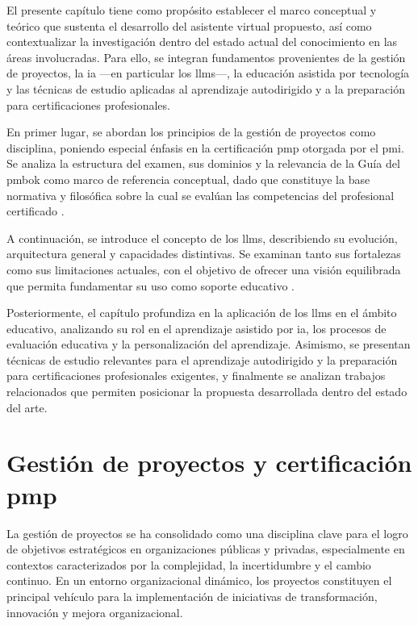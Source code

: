 El presente capítulo tiene como propósito establecer el marco conceptual y teórico que sustenta el desarrollo del asistente virtual propuesto, así como contextualizar la investigación dentro del estado actual del conocimiento en las áreas involucradas. Para ello, se integran fundamentos provenientes de la gestión de proyectos, la \gls{ia} —en particular los \glspl{llm}—, la educación asistida por tecnología y las técnicas de estudio aplicadas al aprendizaje autodirigido y a la preparación para certificaciones profesionales.

En primer lugar, se abordan los principios de la gestión de proyectos como disciplina, poniendo especial énfasis en la certificación \gls{pmp} otorgada por el \gls{pmi}. Se analiza la estructura del examen, sus dominios y la relevancia de la Guía del \gls{pmbok} como marco de referencia conceptual, dado que constituye la base normativa y filosófica sobre la cual se evalúan las competencias del profesional certificado \parencite{pmbok7, pmi2021handbook}.

A continuación, se introduce el concepto de los \glspl{llm}, describiendo su evolución, arquitectura general y capacidades distintivas. Se examinan tanto sus fortalezas como sus limitaciones actuales, con el objetivo de ofrecer una visión equilibrada que permita fundamentar su uso como soporte educativo \parencite{zhao2023survey, huang2024hallucination}.

Posteriormente, el capítulo profundiza en la aplicación de los \glspl{llm} en el ámbito educativo, analizando su rol en el aprendizaje asistido por \gls{ia}, los procesos de evaluación educativa y la personalización del aprendizaje. Asimismo, se presentan técnicas de estudio relevantes para el aprendizaje autodirigido y la preparación para certificaciones profesionales exigentes, y finalmente se analizan trabajos relacionados que permiten posicionar la propuesta desarrollada dentro del estado del arte.

\section{Gestión de proyectos y certificación \gls{pmp}}

La gestión de proyectos se ha consolidado como una disciplina clave para el logro de objetivos estratégicos en organizaciones públicas y privadas, especialmente en contextos caracterizados por la complejidad, la incertidumbre y el cambio continuo. En un entorno organizacional dinámico, los proyectos constituyen el principal vehículo para la implementación de iniciativas de transformación, innovación y mejora organizacional.

